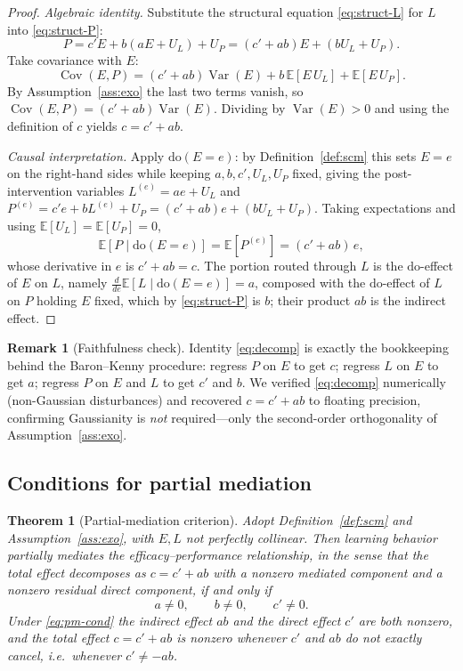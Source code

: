 \documentclass{amsart}
\newtheorem{theorem}{Theorem}
\theoremstyle{definition}
\newtheorem{remark}{Remark}
\begin{document}
\begin{proof}
\emph{Algebraic identity.} Substitute the structural equation
\eqref{eq:struct-L} for $L$ into \eqref{eq:struct-P}:
\[
P=c'E+b(aE+U_L)+U_P=(c'+ab)E+(bU_L+U_P).
\]
Take covariance with $E$:
\[
\operatorname{Cov}(E,P)=(c'+ab)\operatorname{Var}(E)
+b\,\mathbb E[E\,U_L]+\mathbb E[E\,U_P].
\]
By Assumption~\ref{ass:exo} the last two terms vanish, so
$\operatorname{Cov}(E,P)=(c'+ab)\operatorname{Var}(E)$. Dividing by
$\operatorname{Var}(E)>0$ and using the definition of $c$ yields
$c=c'+ab$.

\emph{Causal interpretation.} Apply $\mathrm{do}(E=e)$: by
Definition~\ref{def:scm} this sets $E=e$ on the right-hand sides while keeping
$a,b,c',U_L,U_P$ fixed, giving the post-intervention variables
$L^{(e)}=ae+U_L$ and
$P^{(e)}=c'e+bL^{(e)}+U_P=(c'+ab)e+(bU_L+U_P)$. Taking expectations and using
$\mathbb E[U_L]=\mathbb E[U_P]=0$,
\[
\mathbb E[P\mid\mathrm{do}(E=e)]=\mathbb E[P^{(e)}]=(c'+ab)\,e,
\]
whose derivative in $e$ is $c'+ab=c$. The portion routed through $L$ is the
$\mathrm{do}$-effect of $E$ on $L$, namely $\frac{d}{de}\mathbb E[L\mid\mathrm{do}(E=e)]=a$,
composed with the $\mathrm{do}$-effect of $L$ on $P$ holding $E$ fixed, which by
\eqref{eq:struct-P} is $b$; their product $ab$ is the indirect effect.
\end{proof}

\begin{remark}[Faithfulness check]
Identity \eqref{eq:decomp} is exactly the bookkeeping behind the Baron--Kenny
procedure: regress $P$ on $E$ to get $c$; regress $L$ on $E$ to get $a$;
regress $P$ on $E$ and $L$ to get $c'$ and $b$. We verified \eqref{eq:decomp}
numerically (non-Gaussian disturbances) and recovered $c=c'+ab$ to floating
precision, confirming Gaussianity is \emph{not} required---only the second-order
orthogonality of Assumption~\ref{ass:exo}.
\end{remark}

\subsection{Conditions for partial mediation}

\begin{theorem}[Partial-mediation criterion]\label{thm:partial}
Adopt Definition~\ref{def:scm} and Assumption~\ref{ass:exo}, with $E,L$ not
perfectly collinear. Then learning behavior \emph{partially mediates} the
efficacy--performance relationship, in the sense that the total effect
decomposes as $c=c'+ab$ with a nonzero mediated component and a nonzero
residual direct component, \emph{if and only if}
\begin{equation}\label{eq:pm-cond}
a\neq0,\qquad b\neq0,\qquad c'\neq0 .
\end{equation}
Under \eqref{eq:pm-cond} the indirect effect $ab$ and the direct effect $c'$
are both nonzero, and the total effect $c=c'+ab$ is nonzero whenever
$c'$ and $ab$ do not exactly cancel, i.e.\ whenever $c'\neq-ab$.
\end{theorem}
\end{document}
